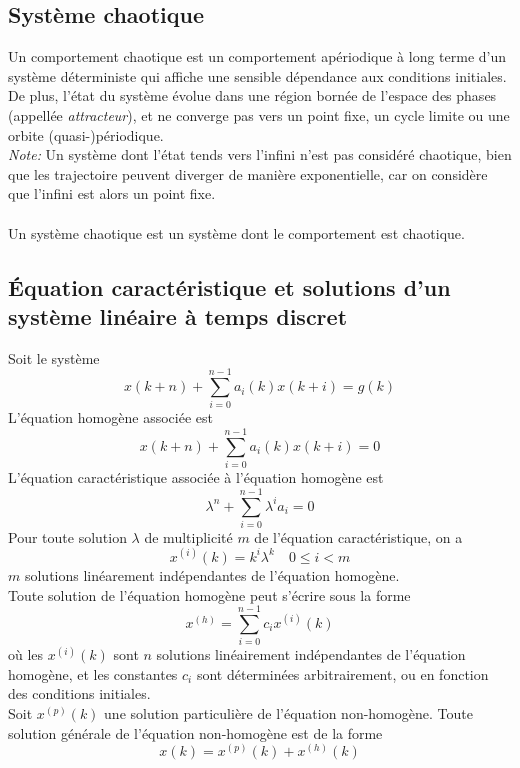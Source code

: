 \documentclass[a4paper]{article}
\begin{document}
\subsection{Système chaotique}
Un comportement chaotique est un comportement apériodique à long terme
d'un système déterministe qui affiche une sensible dépendance aux
conditions initiales. De plus, l'état du système évolue dans une région bornée
de l'espace des phases (appellée \emph{attracteur}), et ne converge pas vers un
point fixe, un cycle limite ou une orbite (quasi-)périodique.\\
\emph{Note:} Un système dont l'état tends vers l'infini n'est pas considéré
chaotique, bien que les trajectoire peuvent diverger de manière exponentielle,
car on considère que l'infini est alors un point fixe.
\paragraph{}
Un système chaotique est un système dont le comportement est chaotique.\\

\subsection{Équation caractéristique et solutions d'un système linéaire à temps
discret}
Soit le système
\[x(k+n)+\sum_{i=0}^{n-1}a_i(k)x(k+i)=g(k)\]
L'équation homogène associée est
\[x(k+n)+\sum_{i=0}^{n-1}a_i(k)x(k+i)=0\]
L'équation caractéristique associée à l'équation homogène est
\[\lambda^n+\sum_{i=0}^{n-1}\lambda^ia_i=0\]
Pour toute solution \(\lambda\) de multiplicité \(m\) de l'équation
caractéristique, on a
\[x^{(i)}(k)=k^i\lambda^k\quad 0\le i<m\]
\(m\) solutions linéarement indépendantes de l'équation homogène.\\
Toute solution de l'équation homogène peut s'écrire sous la forme
\[x^{(h)}=\sum_{i=0}^{n-1}c_ix^{(i)}(k)\]
où les \(x^{(i)}(k)\) sont \(n\) solutions linéairement indépendantes de
l'équation homogène, et les constantes \(c_i\) sont déterminées
arbitrairement, ou en fonction des conditions initiales. \\
Soit \(x^{(p)}(k)\) une solution particulière de l'équation non-homogène.
Toute solution générale de l'équation non-homogène est de la forme
\[x(k)=x^{(p)}(k)+x^{(h)}(k)\]
\end{document}
